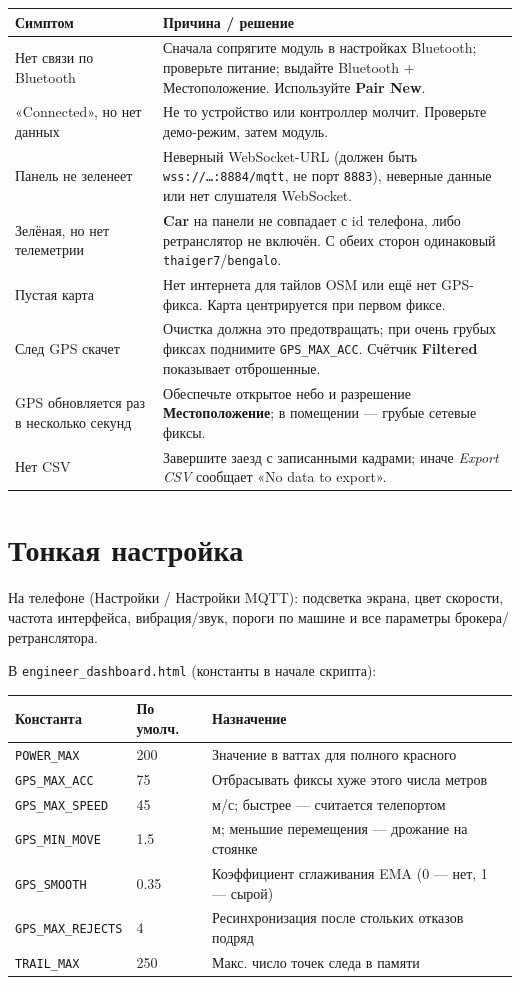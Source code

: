 \documentclass[11pt,a4paper,oneside]{report}
\newcommand{\code}[1]{\texttt{#1}}
\begin{document}
\begin{tabularx}{\linewidth}{@{}LL@{}}
\toprule
\textbf{Симптом} & \textbf{Причина / решение}\\
\midrule
Нет связи по Bluetooth & Сначала сопрягите модуль в настройках Bluetooth; проверьте питание; выдайте Bluetooth + Местоположение. Используйте \textbf{Pair New}.\\
«Connected», но нет данных & Не то устройство или контроллер молчит. Проверьте демо-режим, затем модуль.\\
Панель не зеленеет & Неверный WebSocket-URL (должен быть \code{wss://\ldots:8884/mqtt}, не порт \code{8883}), неверные данные или нет слушателя WebSocket.\\
Зелёная, но нет телеметрии & \textbf{Car} на панели не совпадает с id телефона, либо ретранслятор не включён. С обеих сторон одинаковый \code{thaiger7}/\code{bengalo}.\\
Пустая карта & Нет интернета для тайлов OSM или ещё нет GPS-фикса. Карта центрируется при первом фиксе.\\
След GPS скачет & Очистка должна это предотвращать; при очень грубых фиксах поднимите \code{GPS\_MAX\_ACC}. Счётчик \textbf{Filtered} показывает отброшенные.\\
GPS обновляется раз в несколько секунд & Обеспечьте открытое небо и разрешение \textbf{Местоположение}; в помещении --- грубые сетевые фиксы.\\
Нет CSV & Завершите заезд с записанными кадрами; иначе \emph{Export CSV} сообщает «No data to export».\\
\bottomrule
\end{tabularx}

\section{Тонкая настройка}
На телефоне (Настройки / Настройки MQTT): подсветка экрана, цвет скорости, частота
интерфейса, вибрация/звук, пороги по машине и все параметры брокера/ретранслятора.

\medskip
\noindent В \code{engineer\_dashboard.html} (константы в начале скрипта):

\begin{tabularx}{\linewidth}{@{}llL@{}}
\toprule
\textbf{Константа} & \textbf{По умолч.} & \textbf{Назначение}\\
\midrule
\code{POWER\_MAX} & 200 & Значение в ваттах для полного красного\\
\code{GPS\_MAX\_ACC} & 75 & Отбрасывать фиксы хуже этого числа метров\\
\code{GPS\_MAX\_SPEED} & 45 & м/с; быстрее --- считается телепортом\\
\code{GPS\_MIN\_MOVE} & 1.5 & м; меньшие перемещения --- дрожание на стоянке\\
\code{GPS\_SMOOTH} & 0.35 & Коэффициент сглаживания EMA (0 --- нет, 1 --- сырой)\\
\code{GPS\_MAX\_REJECTS} & 4 & Ресинхронизация после стольких отказов подряд\\
\code{TRAIL\_MAX} & 250 & Макс. число точек следа в памяти\\
\bottomrule
\end{tabularx}
\end{document}
